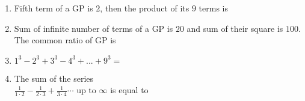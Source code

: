\documentclass[journal,12pt,twocolumn]{IEEEtran}
\theoremstyle{remark}
\begin{document}
\begin{enumerate}[label={\arabic*.}]
\item {Fifth term of a GP is $2$, then the product of its $9$ terms is}
{\hfill{}}
\begin{enumerate}[label={\brak{\alph*}}]		
\end{enumerate}

\item {Sum of infinite number of terms of a GP is $20$ and sum of their square is $100$. The common ratio of GP is}
{\hfill{}} 
\begin{enumerate}[label={\brak{\alph*}}]		
\end{enumerate} 

\item {$1^{3}-2^{3}+3^{3}-4^{3}+...
+9^{3}=$}
{\hfill{}} 
\begin{enumerate}[label={\brak{\alph*}}]
\end{enumerate}

\item {The sum of the series \\ $\frac{1}{1\cdot2}-\frac{1}{2\cdot3}+\frac{1}{3\cdot4}\cdots \text{ up to } \infty$ is equal to} 
{\hfill{}} 
\begin{enumerate}[label={\brak{\alph*}}]
\end{enumerate}


\end{enumerate}
\end{document}
